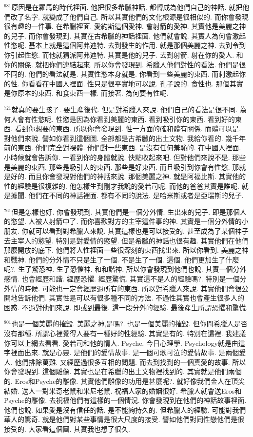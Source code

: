 \documentclass{book}
\begin{document}
$^{681}$原因是在羅馬的時代裡面.
他把很多希臘神話.
都轉成為他們自己的神話.
就把他們改了名字.
就變成了他們自己.
所以其實他們的文化根源是很相似的.
而你會發現很有趣的一件事.
在希臘裡面.
愛約斯這個愛神.
會射箭的愛神.
其實他是美麗之神的兒子.
而你會發現到.
其實在古希臘的神話裡面.
他們就會說.
其實人為何會激起性慾呢.
基本上就是這個阿弗迪特.
去到發生的作用.
就是那個美麗之神.
去到令到你引起性慾.
而他就猜派阿弗迪特.
其實是他的兒子.
去到射箭.
射在你的愛人.
和你的關係.
就把你們連結起來.
所以你會發現到.
希臘人他們對性的看法.
他們是很不同的.
他們的看法就是.
其實性慾本身就是.
你看到一些美麗的東西.
而刺激起你的性.
你看看在中國人裡面.
性只是很平實地可以說.
孔子說的.
食性也.
那個其實是你原本的東西.
和食東西一樣.
而接著.
為何要有性呢.

$^{721}$就真的要生孩子.
要生產後代.
但是對希臘人來說.
他們自己的看法是很不同.
為何人會有性慾呢.
性慾是因為你看到美麗的東西.
看到吸引你的東西.
看到好的東西.
看到你想要的東西.
所以你會發現到.
性一方面的確和體有關係.
而體可以是.
對他們來說.
譬如你看到這個圖.
全部都是古希臘的出土文物.
我給你看的.
幾千年前的東西.
他們完全對裸體.
他們對一些東西.
是沒有任何羞恥的.
在中國人裡面.
小時候就會告訴你.
一看到你的身體就說.
快點收起來吧.
但對他們來說不是.
那些是美麗的東西.
那些是吸引人的東西.
那些是好東西.
而且吸引到你會有性慾.
那就是好的.
而且你會發現對他們的神話來說.
那個美麗之神.
就是阿福比斯.
其實他的性的經驗是很複雜的.
他怎樣生到剛才我說的愛若司呢.
而他的爸爸其實是誰呢.
就是據聞.
他們在不同的神話裡面.
都有不同的說法.
是哈米斯或者是亞瑞斯的兒子.

$^{761}$但是怎樣也好.
你會發現到.
其實他們是一個分外情.
生出來的兒子.
即是那個人的慾望.
人被人射箭中了.
而你喜歡對方的主宰這件事的神.
其實是一個分外情的小朋友.
你就可以看到對希臘人來說.
其實這樣也是可以接受的.
甚至成為了某個神子去主宰人的慾望.
特別是對愛情的慾望.
但是希臘的神話也很有趣.
其實他們在他們那麼開放的底下.
他們將人性裡面一些很深刻的東西找出來.
所以你看到.
美麗之神和戰神.
他們的分外情不只是生了一個.
不是生了一個.
這個.
他們更加生了什麼呢?.
生了驚恐神.
生了恐懼神.
和和諧神.
所以你會發現到他們也說.
其實一個分外感情.
也會經歷和諧.
經歷恐懼.
經歷驚慌.
其實這不是人的經驗嗎?.
特別是一個分外情的時候.
可能也一定會經歷過所有的東西.
所以對希臘人來說.
其實他們會很公開地告訴他們.
其實性是可以有很多種不同的方法.
不過性其實也會產生很多人的困惑.
不過對他們來說.
即或到最後.
這一段分外的經驗.
最後產生所謂恐懼和驚慌.

$^{801}$也是一個美麗的摧毀.
美麗之神,是嗎?.
也是一個美麗的摧毀.
但你問希臘人是否沒有那種.
所謂心裡覺得人要有一種好的性經驗.
其實是有的.
特別在這裡.
我建議你可以上網去看看.
愛若司和他的情人.
Psyche.
今日心理學.
Psychology就是由這字裡面出來.
就是心靈.
是他們的愛情故事.
是一個可歌可泣的愛情故事.
是兩個愛人.
他們排除萬難.
又經歷過很多互相的問題.
而去到找到的一個真愛的故事.
所以你會發現到.
這個雕像.
其實也是在希臘的出土文物裡找到的.
其實就是他們兩個的.
Eros和Psyche的雕像.
其實他們雕像的功用是甚麼呢?.
就好像我們金人在頂尖結婚.
送人一對米奇老鼠和米尼老鼠.
祝福人家的婚姻很好.
希臘人就會送Eros和Psyche的雕像.
去祝福他們有這樣的一個情況.
你會發現到在他們的神話故事裡面.
他們也說.
如果愛是沒有信任的話.
是不能夠持久的.
但希臘人的經驗.
可能對我們華人的驚奇.
就是他們對某些事情是很大尺度的接受.
譬如他們對同性戀他們是很接受的.
大家看這個圖.
其實我也想了很久.
\end{document}
